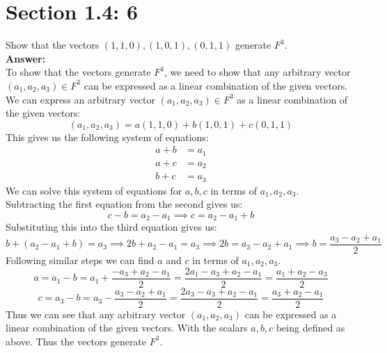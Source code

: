 \documentclass{article}
\begin{document}
\section*{Section 1.4: 6}
Show that the vectors $(1,1,0), (1,0,1), (0,1,1)$ generate $F^3$.\\

 \textbf{Answer:} \\
To show that the vectors generate $F^3$, we need to show that any arbitrary vector $(a_1,a_2,a_3) \in F^3$ can be expressed as a linear combination of the given vectors.\\
We can express an arbitrary vector $(a_1,a_2,a_3) \in F^3$ as a linear combination of the given vectors: 
$$ (a_1,a_2,a_3) = a(1,1,0) + b(1,0,1) + c(0,1,1)$$
This gives us the following system of equations:
\begin{align*}
    a + b &= a_1 \\
    a + c &= a_2 \\
    b + c &= a_3
\end{align*}
We can solve this system of equations for $a,b,c$ in terms of $a_1,a_2,a_3$.\\
Subtracting the first equation from the second gives us:
$$ c - b = a_2 - a_1 \implies c = a_2 - a_1 + b$$
Substituting this into the third equation gives us:
$$ b + (a_2 - a_1 + b) = a_3 \implies 2b + a_2 - a_1 = a_3 \implies 2b = a_3 - a_2 + a_1 \implies b = \frac{a_3 - a_2 + a_1}{2}$$
Following similar steps we can find $a$ and $c$ in terms of $a_1,a_2,a_3$.\\
$$ a = a_1 - b = a_1 + \frac{-a_3 + a_2 - a_1}{2} = \frac{2a_1 - a_3 + a_2 - a_1}{2} = \frac{a_1 + a_2 - a_3}{2}$$
$$ c = a_3 - b = a_3 - \frac{a_3 - a_2 + a_1}{2} = \frac{2a_3 - a_3 + a_2 - a_1}{2} = \frac{a_3 + a_2 - a_1}{2}$$
Thus we can see that any arbitrary vector $(a_1,a_2,a_3)$ can be expressed as a linear combination of the given vectors. With the scalars $a,b,c$ being defined as above. Thus the vectors generate $F^3$.\\
\end{document}

